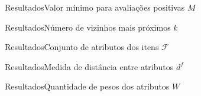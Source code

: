 \begin{frame}{Resultados}{Valor mínimo para avaliações positivas $M$}
\end{frame}

\begin{frame}{Resultados}{Número de vizinhos mais próximos $k$}
\end{frame}

\begin{frame}{Resultados}{Conjunto de atributos dos itens  $\mathcal{F}$}
\end{frame}

\begin{frame}{Resultados}{Medida de distância entre atributos $d^f$}
\end{frame}

\begin{frame}{Resultados}{Quantidade de pesos dos atributos $W$}
\end{frame}